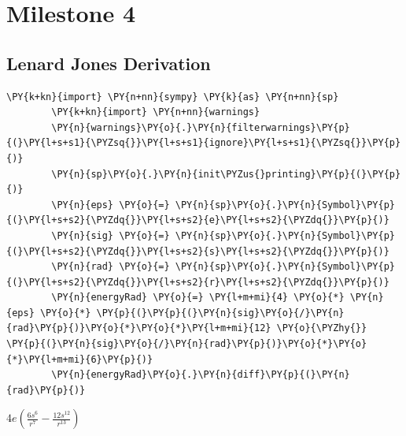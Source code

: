 
\chapter{Milestone 4}
\section{Lenard Jones Derivation}
    \begin{tcolorbox}[breakable, size=fbox, boxrule=1pt, pad at break*=1mm,colback=cellbackground, colframe=cellborder]
	\begin{Verbatim}[commandchars=\\\{\}]
		\PY{k+kn}{import} \PY{n+nn}{sympy} \PY{k}{as} \PY{n+nn}{sp}
		\PY{k+kn}{import} \PY{n+nn}{warnings}
		\PY{n}{warnings}\PY{o}{.}\PY{n}{filterwarnings}\PY{p}{(}\PY{l+s+s1}{\PYZsq{}}\PY{l+s+s1}{ignore}\PY{l+s+s1}{\PYZsq{}}\PY{p}{)}
		\PY{n}{sp}\PY{o}{.}\PY{n}{init\PYZus{}printing}\PY{p}{(}\PY{p}{)}
		\PY{n}{eps} \PY{o}{=} \PY{n}{sp}\PY{o}{.}\PY{n}{Symbol}\PY{p}{(}\PY{l+s+s2}{\PYZdq{}}\PY{l+s+s2}{e}\PY{l+s+s2}{\PYZdq{}}\PY{p}{)}
		\PY{n}{sig} \PY{o}{=} \PY{n}{sp}\PY{o}{.}\PY{n}{Symbol}\PY{p}{(}\PY{l+s+s2}{\PYZdq{}}\PY{l+s+s2}{s}\PY{l+s+s2}{\PYZdq{}}\PY{p}{)}
		\PY{n}{rad} \PY{o}{=} \PY{n}{sp}\PY{o}{.}\PY{n}{Symbol}\PY{p}{(}\PY{l+s+s2}{\PYZdq{}}\PY{l+s+s2}{r}\PY{l+s+s2}{\PYZdq{}}\PY{p}{)}
		\PY{n}{energyRad} \PY{o}{=} \PY{l+m+mi}{4} \PY{o}{*} \PY{n}{eps} \PY{o}{*} \PY{p}{(}\PY{p}{(}\PY{n}{sig}\PY{o}{/}\PY{n}{rad}\PY{p}{)}\PY{o}{*}\PY{o}{*}\PY{l+m+mi}{12} \PY{o}{\PYZhy{}} \PY{p}{(}\PY{n}{sig}\PY{o}{/}\PY{n}{rad}\PY{p}{)}\PY{o}{*}\PY{o}{*}\PY{l+m+mi}{6}\PY{p}{)}
		\PY{n}{energyRad}\PY{o}{.}\PY{n}{diff}\PY{p}{(}\PY{n}{rad}\PY{p}{)}
	\end{Verbatim}
\end{tcolorbox}



$\displaystyle 4 e \left(\frac{6 s^{6}}{r^{7}} - \frac{12 s^{12}}{r^{13}}\right)$




